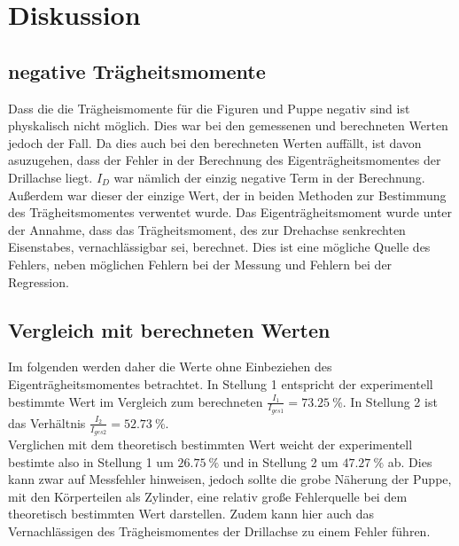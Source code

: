 \section{Diskussion}
\label{sec:Diskussion}
    \subsection{negative Trägheitsmomente}
    Dass die die Trägheismomente für die Figuren und Puppe negativ sind ist physkalisch nicht möglich.
    Dies war bei den gemessenen und berechneten Werten jedoch der Fall.
    Da dies auch bei den berechneten Werten auffällt, ist davon asuzugehen, dass der Fehler in der Berechnung des Eigenträgheitsmomentes der Drillachse liegt.
    $I_D$ war nämlich der einzig negative Term in der Berechnung.
    Außerdem war dieser der einzige Wert, der in beiden Methoden zur Bestimmung des Trägheitsmomentes verwentet wurde.
    Das Eigenträgheitsmoment wurde unter der Annahme, dass das Trägheitsmoment, des zur Drehachse senkrechten Eisenstabes, vernachlässigbar sei, berechnet.
    Dies ist eine mögliche Quelle des Fehlers, neben möglichen Fehlern bei der Messung und Fehlern bei der Regression.\\ 

    \subsection{Vergleich mit berechneten Werten}
    Im folgenden werden daher die Werte ohne Einbeziehen des Eigenträgheitsmomentes betrachtet.
    In Stellung 1 entspricht der experimentell bestimmte Wert im Vergleich zum berechneten $\frac{I_1}{I_{ges1}}=\qty{73.25}{\percent}$.\;
    In Stellung 2 ist das Verhältnis $\frac{I_2}{I_{ges2}}=\qty{52.73}{\percent}$.\\
    Verglichen mit dem theoretisch bestimmten Wert weicht der experimentell bestimte also in Stellung 1 um $\qty{26.75}{\percent}$ und in Stellung 2 um $\qty{47.27}{\percent}$ ab.
    Dies kann zwar auf Messfehler hinweisen, jedoch sollte die grobe Näherung der Puppe, mit den Körperteilen als Zylinder, eine relativ große Fehlerquelle bei dem theoretisch bestimmten Wert darstellen.
    Zudem kann hier auch das Vernachlässigen des Trägheismomentes der Drillachse zu einem Fehler führen.